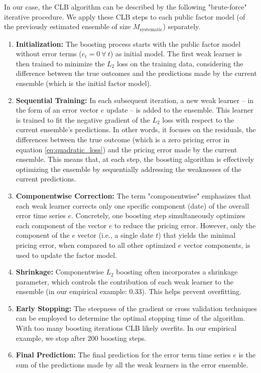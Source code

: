 \documentclass[12pt]{article}
\begin{document}
In our case, the CLB algorithm can be described by the following "brute-force" iterative procedure. 
We apply these CLB steps to each public factor model (of the previously estimated ensemble of size $M_{\mathrm{systematic}}$) separately.
\begin{enumerate}
	\item \textbf{Initialization:} 
	The boosting process starts with the public factor model without error terms ($e_t = 0 \ \forall \ t$) as initial model. 
	The first weak learner is then trained to minimize the $L_2$ loss on the training data, considering the difference between the true outcomes and the predictions made by the current ensemble (which is the initial factor model).
	\item \textbf{Sequential Training:} 
	In each subsequent iteration, a new weak learner -- in the form of an error vector $e$ update -- is added to the ensemble. 
	This learner is trained to fit the negative gradient of the $L_2$ loss with respect to the current ensemble's predictions. 
	In other words, it focuses on the residuals, the differences between the true outcome (which is a zero pricing error in equation \ref{eq:quadratic_loss}) and the pricing error made by the current ensemble.
	This means that, at each step, the boosting algorithm is effectively optimizing the ensemble by sequentially addressing the weaknesses of the current predictions.
	\item \textbf{Componentwise Correction:} 
	The term "componentwise" emphasizes that each weak learner corrects only one specific component (date) of the overall error time series $e$. 
	Concretely, one boosting step simultaneously optimizes each component of the vector $e$ to reduce the pricing error.
	However, only the component of the $e$ vector (i.e., a single date $t$) that yields the minimal pricing error, when compared to all other optimized $e$ vector components, is used to update the factor model.
	\item \textbf{Shrinkage:} 
	Componentwise $L_2$ boosting often incorporates a shrinkage parameter, which controls the contribution of each weak learner to the ensemble (in our empirical example: 0.33). 
	This helps prevent overfitting.
	\item \textbf{Early Stopping:} 
	The steepness of the gradient or cross validation techniques can be employed to determine the optimal stopping time of the algorithm. 
	With too many boosting iterations CLB likely overfits.
	In our empirical example, we stop after 200 boosting steps.
	\item \textbf{Final Prediction:} 
	The final prediction for the error term time series $e$ is the sum of the predictions made by all the weak learners in the error ensemble.
\end{enumerate}
\end{document}
